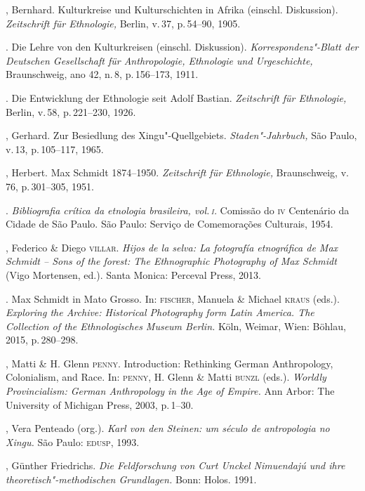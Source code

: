 \begin{bibliohedra}
 , Bernhard. Kulturkreise und Kulturschichten in Afrika
 (einschl. Diskussion). \textit{Zeitschrift für Ethnologie,} Berlin, v.\,37, p.\,54--90, 1905.

 \titidem. Die Lehre von den Kulturkreisen (einschl.
 Diskussion). \textit{Korrespondenz"-Blatt der Deutschen Gesellschaft für
 Anthropologie, Ethnologie und Urgeschichte,} Braunschweig, ano 42, n.\,8,
 p.\,156--173, 1911.

 \titidem. Die Entwicklung der Ethnologie seit Adolf Bastian.
 \textit{Zeitschrift für Ethnologie,} Berlin, v.\,58, p.\,221--230, 1926.

 , Gerhard. Zur Besiedlung des Xingu"-Quellgebiets.
 \textit{Staden"-Jahrbuch,} São Paulo, v.\,13, p.\,105--117, 1965.

 , Herbert. Max Schmidt 1874--1950. \textit{Zeitschrift für
 Ethnologie,} Braunschweig, v.\,76, p.\,301--305, 1951.

 \titidem. \textit{Bibliografia crítica da etnologia
 brasileira, vol.\,\textsc{i}.} Comissão do \textsc{iv} Centenário da Cidade de São Paulo.
 São Paulo: Serviço de Comemorações Culturais, 1954.

 , Federico \& Diego \textsc{villar}. \textit{Hijos de la selva: La
 fotografía etnográfica de Max Schmidt -- Sons of the forest: The
 Ethnographic Photography of Max Schmidt} (Vigo Mortensen, ed.). Santa
 Monica: Perceval Press, 2013.

 \titidem. Max Schmidt in Mato Grosso. In: \textsc{fischer}, Manuela
 \& Michael \textsc{kraus} (eds.). \textit{Exploring the Archive: Historical
 Photography form Latin America. The Collection of the Ethnologisches
 Museum Berlin.} Köln, Weimar, Wien: Böhlau, 2015, p.\,280--298.

 , Matti \& H. Glenn \textsc{penny}. Introduction: Rethinking German
 Anthropology, Colonialism, and Race. In: \textsc{penny}, H. Glenn \& Matti \textsc{bunzl}
 (eds.). \textit{Worldly Provincialism: German Anthropology in the Age of
 Empire.} Ann Arbor: The University of Michigan Press, 2003, p.\,1--30.

 , Vera Penteado (org.). \textit{Karl von den Steinen: um século de
 antropologia no Xingu.} São Paulo: \textsc{edusp}, 1993.

 , Günther Friedrichs. \textit{Die Feldforschung von Curt Unckel
 Nimuendajú und ihre theoretisch"-methodischen Grundlagen.} Bonn: Holos.
 1991.


\end{bibliohedra}
